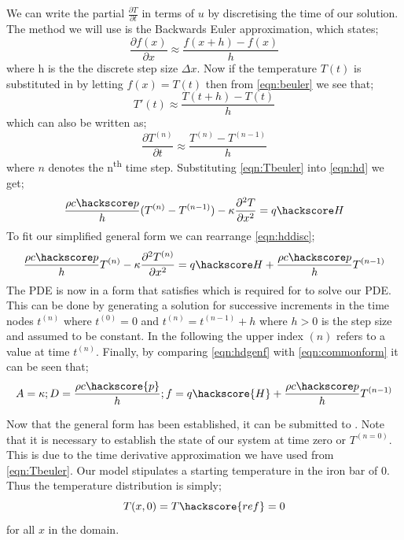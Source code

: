 We can write the partial $\frac{\partial T}{\partial t}$ in terms of $u$ by discretising the time of our solution. The method we will use is the Backwards Euler approximation, which states;
\begin{equation}
\frac{\partial f(x)}{\partial x} \approx \frac{f(x+h)-f(x)}{h}
\label{eqn:beuler}
\end{equation}
where h is the the discrete step size $\Delta x$.
Now if the temperature $T(t)$ is substituted in by letting $f(x) = T(t)$ then from \ref{eqn:beuler} we see that;
\begin{equation}
T'(t) \approx \frac{T(t+h) - T(t)}{h}
\end{equation}
which can also be written as;
\begin{equation}
\frac{\partial T^{(n)}}{\partial t} \approx \frac{T^{(n)} - T^{(n-1)}}{h}
\label{eqn:Tbeuler}
\end{equation}
where $n$ denotes the n\textsuperscript{th} time step. Substituting \ref{eqn:Tbeuler} into \ref{eqn:hd} we get;
\begin{equation}
\frac{\rho c\hackscore p}{h} (T^{(n)} - T^{(n-1)}) - \kappa \frac{\partial^{2} T}{\partial x^{2}} = q\hackscore H 
\label{eqn:hddisc}
\end{equation}
To fit our simplified general form we can rearrange \ref{eqn:hddisc};
\begin{equation}
\frac{\rho c\hackscore p}{h} T^{(n)} - \kappa \frac{\partial^2 T^{(n)}}{\partial x^2} = q\hackscore H +  \frac{\rho c\hackscore p}{h} T^{(n-1)}
\label{eqn:hdgenf}
\end{equation}
The PDE is now in a form that satisfies  which is required for \esc to solve our PDE. This can be done by generating a solution for successive increments in the time nodes $t^{(n)}$ where 
$t^{(0)}=0$ and  $t^{(n)}=t^{(n-1)}+h$ where $h>0$ is the step size and assumed to be constant. 
In the following the upper index ${(n)}$ refers to a value at time $t^{(n)}$. Finally, by comparing \ref{eqn:hdgenf} with \ref{eqn:commonform} it can be seen that;
\begin{equation}
A = \kappa; D = \frac{\rho c \hackscore{p}}{h}; f = q \hackscore{H} + \frac{\rho c\hackscore p}{h} T^{(n-1)}
\end{equation}

Now that the general form has been established, it can be submitted to \esc. Note that it is necessary to establish the state of our system at time zero or $T^{(n=0)}$. This is due to the time derivative approximation we have used from \ref{eqn:Tbeuler}. Our model stipulates a starting temperature in the iron bar of 0\textcelsius. Thus the temperature distribution is simply;
\begin{equation}
T(x,0) = T\hackscore{ref} = 0
\end{equation}
for all $x$ in the domain. 

